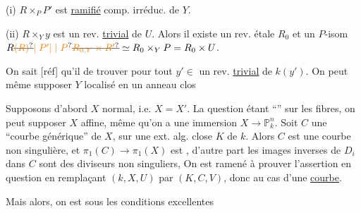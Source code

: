 (i) $R\times_P P'$ est  \uline{ ramifié}   comp. irréduc. de $Y$. \deleted{[NB Si $Y$ est régulier, il suffit de}

(ii) $R\times_Y y$ est un rev. \uline{trivial} de $U$.
\margin{\rule{.4pt}{3em}}
Alors il existe un rev. étale $R_0$   et  un $P$-isom $R\deleted{\unsure{(R)}}\unsure{\mid P'|\mid P}\deleted{\unsure{R_{0,Y}\times R'}}\simeq R_0\times_Y P=R_0\times U$.


On sait [réf] qu'il  de trouver pour tout $y'\in$   un rev. \uline{trivial} de $k(y')$. On peut même supposer $Y$ localisé en un anneau  clos 

Supposons d'abord $X$ normal, i.e. $X=X'$.  La question étant  ``'' sur les fibres, on peut supposer $X$ affine, même qu'on a une immersion $X\longrightarrow\mathbb P^n_k$. 
 Soit $C$ une ``courbe générique'' de $X$,    sur une ext. alg. close $K$ de $k$. Alors
$C$ est une courbe non singulière, et $\pi_1(C)\to\pi_1(X)$ est , d'autre part les images inverses de $D_i$ dans $C$ sont des diviseurs non singuliers,  
\margin{\rule{4em}{.4pt}}
On est ramené à prouver l'assertion en question en remplaçant $(k,X,U)$ par $(K,C,V)$, donc au cas d'une \uline{courbe}.

Mais alors, on est sous les conditions excellentes
